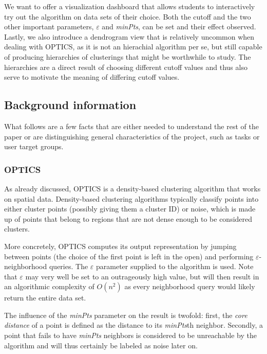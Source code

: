 \documentclass{vgtc}                          %
\begin{document}
We want to offer a visualization dashboard that allows students to
interactively try out the algorithm on data sets of their choice. Both the
cutoff and the two other important parameters, $\varepsilon$ and \emph{minPts}, can
be set and their effect observed. Lastly, we also introduce a dendrogram view
that is relatively uncommon when dealing with OPTICS, as it is not an hierachial
algorithm per se, but still capable of producing hierarchies of clusterings
that might be worthwhile to study. The hierarchies are a direct result of
choosing different cutoff values and thus also serve to motivate the meaning of
differing cutoff values.

\subsection{Background information}

What follows are a few facts that are either needed to understand the rest
of the paper or are distinguishing general characteristics of the project,
such as tasks or user target groups.

\subsubsection{OPTICS}

As already discussed, OPTICS is a density-based clustering algorithm that works
on spatial data. Density-based clustering algorithms typically classify points
into either cluster points (possibly giving them a cluster ID) or noise, which
is made up of points that belong to regions that are not dense enough to be
considered clusters.

More concretely, OPTICS computes its output representation by jumping between
points (the choice of the first point is left in the open) and performing
$\varepsilon$-neighborhood queries. The $\varepsilon$ parameter supplied to the
algorithm is used. Note that $\varepsilon$ may very well be set to an
outrageously high value, but will then result in an algorithmic complexity of
$O(n^2)$ as every neighborhood query would likely return the entire data set.

The influence of the \emph{minPts} parameter on the result is twofold: first,
the \emph{core distance} of a point is defined as the distance to its
\emph{minPts}th neighbor. Secondly, a point that fails to have \emph{minPts}
neighbors is considered to be unreachable by the algorithm and will thus
certainly be labeled as noise later on.
\end{document}

